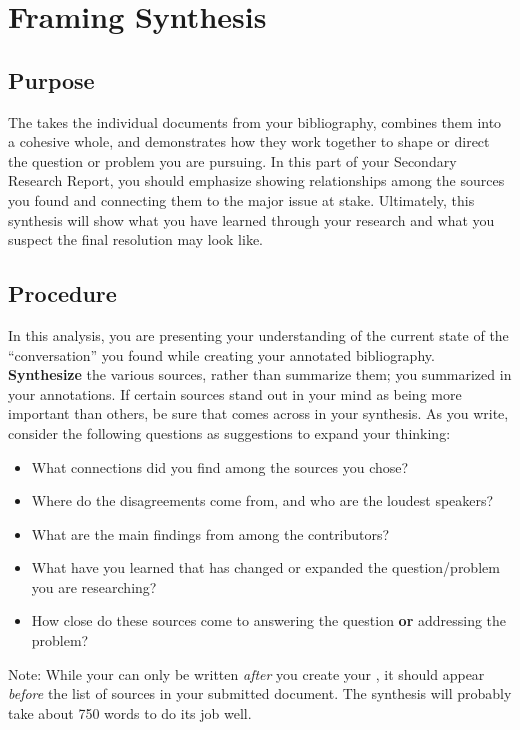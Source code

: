 \documentclass[11pt]{amsart}	%
\begin{document}
\clearpage
\section{Framing Synthesis} %
\label{sec:framing_synthesis}

\subsection{Purpose} %
\label{sec:synth-purpose}
The  takes the individual documents from your bibliography, combines them into a cohesive whole, and demonstrates how they work together to shape or direct the question or problem you are pursuing. In this part of your Secondary Research Report, you should emphasize showing relationships among the sources you found and connecting them to the major issue at stake. Ultimately, this synthesis will show what you have learned through your research and what you suspect the final resolution may look like.

\subsection{Procedure} %
\label{sec:synth-procedure}
In this analysis, you are presenting your understanding of the current state of the “conversation” you found while creating your annotated bibliography. \textbf{Synthesize} the various sources, rather than summarize them; you summarized in your annotations. If certain sources stand out in your mind as being more important than others, be sure that comes across in your synthesis. As you write, consider the following questions as suggestions to expand your thinking:
\begin{itemize}
	\item What connections did you find among the sources you chose?
	\item Where do the disagreements come from, and who are the loudest speakers?
	\item What are the main findings from among the contributors?
	\item  What have you learned that has changed or expanded the question/problem you are researching?
	\item  How close do these sources come to answering the question \textbf{or} addressing the problem?
\end{itemize}

Note: While your  can only be written \emph{after} you create your , it should appear \emph{before} the list of sources in your submitted document. The synthesis will probably take about 750 words to do its job well.
\end{document}
